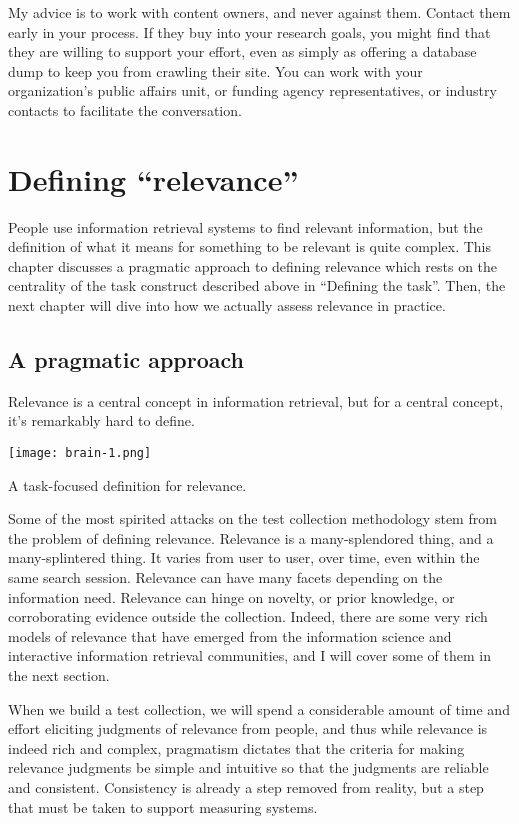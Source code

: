 \documentclass[nobib]{tufte-book}
\begin{document}
My advice is to work with content owners, and never against them.  Contact them early in your process.  If they buy into your research goals, you might find that they are willing to support your effort, even as simply as offering a database dump to keep you from crawling their site.  You can work with your organization's public affairs unit, or funding agency representatives, or industry contacts to facilitate the conversation.

\chapter{Defining ``relevance''}

People use information retrieval systems to find relevant information, but the definition of what it means for something to be relevant is quite complex.  This chapter discusses a pragmatic approach to defining relevance which rests on the centrality of the task construct described above in ``Defining the task''.  Then, the next chapter will dive into how we actually assess relevance in practice.

\section{A pragmatic approach}

Relevance is a central concept in information retrieval, but for a central concept, it's remarkably hard to define. 
\begin{marginfigure}
    \texttt{[image: brain-1.png]}
    \caption{A task-focused definition for relevance.}
\end{marginfigure}
Some of the most spirited attacks on the test collection methodology stem from the problem of defining relevance.  Relevance is a many-splendored thing, and a many-splintered thing.  It varies from user to user, over time, even within the same search session.  Relevance can have many facets depending on the information need.  Relevance can hinge on novelty, or prior knowledge, or corroborating evidence outside the collection.  Indeed, there are some very rich models of relevance that have emerged from the information science and interactive information retrieval communities, and I will cover some of them in the next section.

When we build a test collection, we will spend a considerable amount of time and effort eliciting judgments of relevance from people, and thus while relevance is indeed rich and complex, pragmatism dictates that the criteria for making relevance judgments be simple and intuitive so that the judgments are reliable and consistent.  Consistency is already a step removed from reality, but a step that must be taken to support measuring systems.
\end{document}
